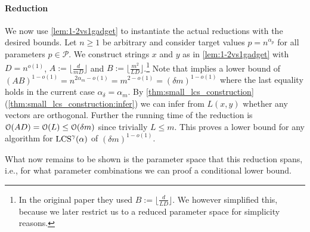 \paragraph*{Reduction}
We now use \autoref{lem:1-2vs1gadget} to instantiate the actual reductions with the desired bounds.
Let $n \geq 1$ be arbitrary and consider target values $p = n^{\alpha_p}$ for all parameters $p \in \mathcal{P}$.
We construct strings $x$ and $y$ as in \autoref{lem:1-2vs1gadget} with $D = n^{o(1)}$, $A := \lfloor \frac{d}{mD} \rfloor$ and $B := \lfloor \frac{m^2}{LD} \rfloor$.\footnote{In the original paper they used $B := \lfloor \frac{d}{LD} \rfloor$. We however simplified this, because we later restrict us to a reduced parameter space for simplicity reasons.}
Note that \uovh{} implies a lower bound of $(AB)^{1-o(1)} = n^{2\alpha_m - o(1)} = m^{2 - o(1)} = (\delta m)^{1-o(1)}$ where the last equality holds in the current case $\alpha_\delta = \alpha_m$.
By \autoref{thm:small_lcs_construction} (\ref{thm:small_lcs_construction:infer}) we can infer from $L(x,y)$ whether any vectors are orthogonal.
Further the running time of the reduction is $\mathcal{O}(AD) = \mathcal{O}(L) \leq \mathcal{O}(\delta m)$ since trivially $L \leq m$.
This proves a lower bound for any algorithm for $\text{LCS}^\gamma(\mathbb{\alpha})$ of $(\delta m)^{1-o(1)}$.


What now remains to be shown is the parameter space that this reduction spans, i.e., for what \lcs{} parameter combinations we can proof a conditional lower bound.

